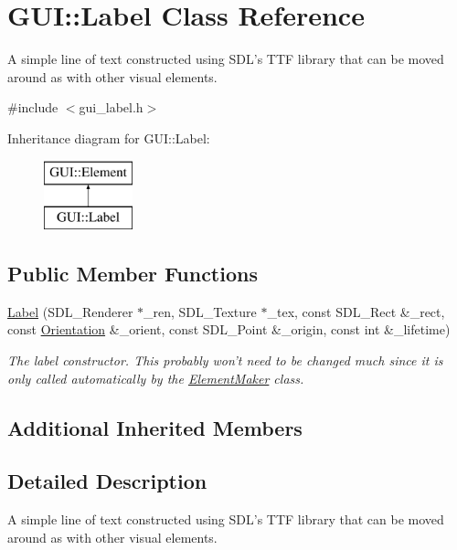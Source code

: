 \hypertarget{classGUI_1_1Label}{\section{G\-U\-I\-:\-:Label Class Reference}
\label{classGUI_1_1Label}
}


A simple line of text constructed using S\-D\-L's T\-T\-F library that can be moved around as with other visual elements.  




{\ttfamily \#include $<$gui\-\_\-label.\-h$>$}

Inheritance diagram for G\-U\-I\-:\-:Label\-:\begin{figure}[H]
\begin{center}
\leavevmode
\includegraphics[height=2.000000cm]{classGUI_1_1Label}
\end{center}
\end{figure}
\subsection*{Public Member Functions}
\begin{DoxyCompactItemize}
\item 
\hyperlink{classGUI_1_1Label_acefb69223dadf21ceca45f8c12965c3e}{Label} (S\-D\-L\-\_\-\-Renderer $\ast$\-\_\-ren, S\-D\-L\-\_\-\-Texture $\ast$\-\_\-tex, const S\-D\-L\-\_\-\-Rect \&\-\_\-rect, const \hyperlink{namespaceGUI_a1a3a8094d47f7be06ce123fab38abf6a}{Orientation} \&\-\_\-orient, const S\-D\-L\-\_\-\-Point \&\-\_\-origin, const int \&\-\_\-lifetime)
\begin{DoxyCompactList}\small\item\em The label constructor. This probably won't need to be changed much since it is only called automatically by the \hyperlink{classGUI_1_1ElementMaker}{Element\-Maker} class. \end{DoxyCompactList}\end{DoxyCompactItemize}
\subsection*{Additional Inherited Members}


\subsection{Detailed Description}
A simple line of text constructed using S\-D\-L's T\-T\-F library that can be moved around as with other visual elements. 


